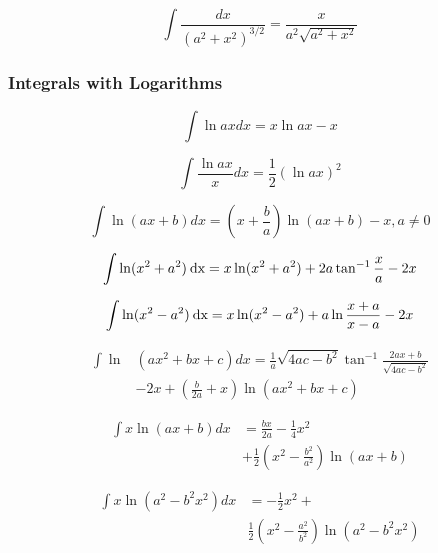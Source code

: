 \documentclass[11pt, letterpaper, notitlepage]{article}
\begin{document}
\begin{multicols}{2}
\begin{footnotesize}
\begin{equation}
\int\frac{dx}{(a^2+x^2)^{3/2}}=\frac{x}{a^2\sqrt{a^2+x^2}}
\end{equation}

\subsubsection{Integrals with Logarithms}

\begin{equation}
\int \ln ax dx = x \ln ax - x 
\end{equation}

\begin{equation}
\int \frac{\ln ax}{x} dx = \frac{1}{2}\left ( \ln ax \right)^2 
\end{equation}

\begin{equation}
\int \ln (ax + b) dx = \left ( x + \frac{b}{a} \right) \ln (ax+b) - x , a\ne 0
\end{equation}

\begin{align}
\int \ln  ( x^2 + a^2 )\hspace{.5ex}\text{dx} = x \ln (x^2 + a^2  ) +2a\tan^{-1} \frac{x}{a} - 2x 
\end{align}

\begin{align}
\int \ln  ( x^2 - a^2 )\hspace{.5ex}\text{dx} = x \ln (x^2 - a^2  ) +a\ln \frac{x+a}{x-a} - 2x \end{align}

\begin{align}
\int \ln & \left ( ax^2 + bx + c\right) dx  = \frac{1}{a}\sqrt{4ac-b^2}\tan^{-1}\frac{2ax+b}{\sqrt{4ac-b^2}}
\nonumber \\ & -2x
 + \left( \frac{b}{2a}+x \right )\ln \left (ax^2+bx+c \right) 
\end{align}

\begin{align}
\int x \ln (ax + b) dx &= \frac{bx}{2a}-\frac{1}{4}x^2 \nonumber
\\&
+\frac{1}{2}\left(x^2-\frac{b^2}{a^2}\right)\ln (ax+b) 
\end{align}

\begin{align}
\int x \ln \left ( a^2 - b^2 x^2 \right ) dx &= -\frac{1}{2}x^2+ \nonumber
\\&
\frac{1}{2}\left( x^2 - \frac{a^2}{b^2} \right ) \ln \left (a^2 -b^2 x^2 \right) 
\end{align}


\end{footnotesize}
\end{multicols}
\end{document}
